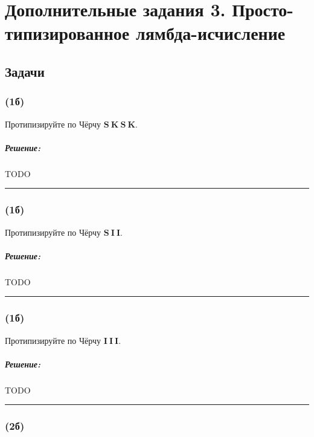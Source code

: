 \documentclass{article}
\newenvironment{proof}{\subparagraph{\hspace{-1em}Решение:\newline}}{\par\noindent\rule{\textwidth}{0.4pt}}
\begin{document}
    \section*{Дополнительные задания 3. Просто-типизированное лямбда-исчисление}

    \subsection{Задачи}

    \subsubsection{(1б)}

    Протипизируйте по Чёрчу $\mathbf{S}~\mathbf{K}~\mathbf{S}~\mathbf{K}$.

    \begin{proof}
        TODO %
    \end{proof}

    \subsubsection{(1б)}

    Протипизируйте по Чёрчу $\mathbf{S}~\mathbf{I}~\mathbf{I}$.

    \begin{proof}
        TODO %
    \end{proof}

    \subsubsection{(1б)}

    Протипизируйте по Чёрчу $\mathbf{I}~\mathbf{I}~\mathbf{I}$.

    \begin{proof}
        TODO %
    \end{proof}

    \subsubsection{(2б)}
\end{document}
